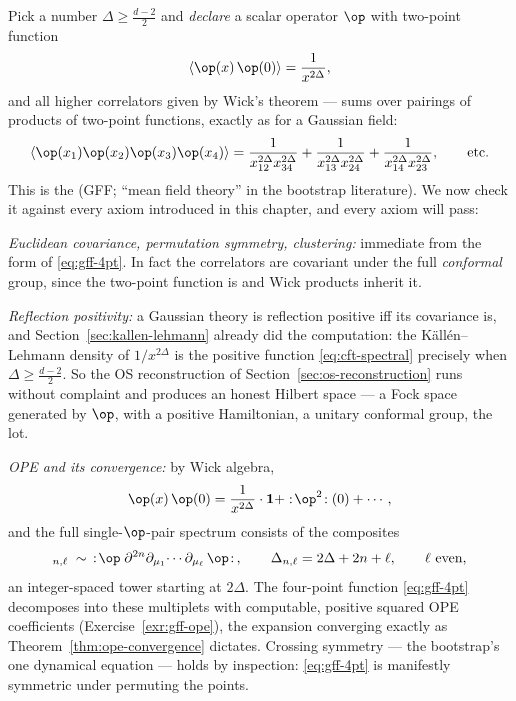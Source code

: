 \begin{eexample}
\label{ex:gff}
Pick a number $\Delta \ge \frac{d-2}{2}$ and \emph{declare} a scalar operator
$\op$ with two-point function
\begin{equation}
\langle \op(x)\,\op(0)\rangle = \frac{1}{x^{2\Delta}},
\end{equation}
and all higher correlators given by Wick's theorem --- sums over pairings of
products of two-point functions, exactly as for a Gaussian field:
\begin{equation}
\langle \op(x_1)\op(x_2)\op(x_3)\op(x_4)\rangle
= \frac{1}{x_{12}^{2\Delta}x_{34}^{2\Delta}}
+ \frac{1}{x_{13}^{2\Delta}x_{24}^{2\Delta}}
+ \frac{1}{x_{14}^{2\Delta}x_{23}^{2\Delta}},
\qquad \text{etc.}
\label{eq:gff-4pt}
\end{equation}
This is the  (GFF; ``mean field theory'' in
the bootstrap literature). We now check it against every axiom introduced in
this chapter, and every axiom will pass:

\emph{Euclidean covariance, permutation symmetry, clustering:} immediate from
the form of \eqref{eq:gff-4pt}. In fact the correlators are covariant under
the full \emph{conformal} group, since the two-point function is and Wick
products inherit it.

\emph{Reflection positivity:} a Gaussian theory is reflection positive iff its
covariance is, and Section~\ref{sec:kallen-lehmann} already did the
computation: the K\"all\'en--Lehmann density of $1/x^{2\Delta}$ is the
positive function \eqref{eq:cft-spectral} precisely when $\Delta \ge
\frac{d-2}{2}$. So the OS reconstruction of
Section~\ref{sec:os-reconstruction} runs without complaint and produces an
honest Hilbert space --- a Fock space generated by $\op$, with a positive
Hamiltonian, a unitary conformal group, the lot.

\emph{OPE and its convergence:} by Wick algebra,
\begin{equation}
\op(x)\,\op(0) = \frac{1}{x^{2\Delta}}\cdot\mathbf 1
+ :\!\op^2\!:(0) + \cdots,
\end{equation}
and the full single-$\op$-pair spectrum consists of the 
composites
\begin{equation}
[\op\op]_{n,\ell} \;\sim\;\,
:\!\op\;\partial^{2n}\partial_{\mu_1}\!\cdots\partial_{\mu_\ell}\,\op\!: \,,
\qquad
\Delta_{n, \ell} = 2\Delta + 2n + \ell ,
\qquad \ell \text{ even},
\label{eq:double-twist}
\end{equation}
an integer-spaced tower starting at $2\Delta$. The four-point function
\eqref{eq:gff-4pt} decomposes into these multiplets with computable, positive
squared OPE coefficients (Exercise~\ref{exr:gff-ope}), the expansion
converging exactly as Theorem~\ref{thm:ope-convergence} dictates. Crossing
symmetry --- the bootstrap's one dynamical equation --- holds by inspection:
\eqref{eq:gff-4pt} is manifestly symmetric under permuting the points.


\end{eexample}
